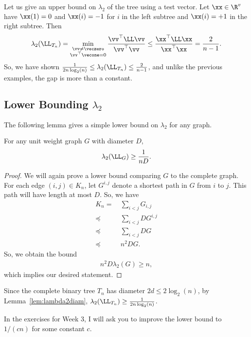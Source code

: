 Let us give an upper bound on $\lambda_2$ of the tree using a test vector.
Let $\xx \in \R^v$ have $\xx(1) = 0$ and $\xx(i) = -1$ for $i$ in the left
subtree and $\xx(i) = +1$ in the right subtree.
Then
\begin{align*}
\lambda_2(\LL_{T_n}) = \min_{ \substack{ \vv \neq \veczero \\ \vv^\top
  \vecone = 0} } \frac{ \vv^\top \LL \vv}{ \vv^\top \vv}
  \leq
  \frac{ \xx^\top \LL \xx}{ \xx^\top \xx}
  =
  \frac{2}{n-1}.
\end{align*}
So, we have shown
$\frac{1}{2n\log_2(n)} \leq \lambda_2(\LL_{T_n})
\leq \frac{2}{n-1}$, and unlike the previous examples, the gap is more than a constant.

\subsection{Lower Bounding $\lambda_2$}

The following lemma gives a simple lower bound on $\lambda_2$ for any graph.
\begin{lemma}
  \label{lem:lambda2diam}
  For any unit weight graph $G$ with diameter $D$,
  \[
    \lambda_2(\LL_G) \geq \frac{1}{nD}.
    \]
\end{lemma}
\begin{proof}
  We will again prove a lower bound comparing $G$ to the complete
  graph. For each edge $(i,j) \in K_n$, let $G^{i,j}$ denote a
  shortest path in $G$ from $i$ to $j$. This path will have length at most $D$. So, we have
\begin{align*}
K_n
= & ~ \sum_{i < j} G_{i,j} \\
\preceq & ~ \sum_{i < j} D G^{i,j} \\
\preceq & ~ \sum_{i < j} D G \\
\preceq & ~ n^2 D G.
\end{align*}
So, we obtain the bound
\begin{align*}
n^2D \lambda_{2} (G) \geq n,
\end{align*}
which implies our desired statement.
\end{proof}

Since the complete binary tree $T_n$ has diameter $2d \leq 2\log_2(n)$,
by Lemma~\ref{lem:lambda2diam}, $\lambda_2(\LL_{T_n}) \geq
\frac{1}{2n\log_2(n)}$. 

In the exercises for Week 3, I will ask you to improve the lower bound to
$1/(cn)$ for some constant $c$.



% 
% 



